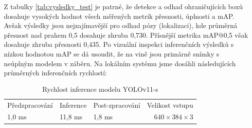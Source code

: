 Z tabulky \ref{tab:vysledky_test} je patrné, že detekce a odhad ohraničujících boxů dosahuje vysokých hodnot všech měřených metrik přesnosti, úplnosti a mAP. Avšak výsledky jsou nejzajímavější pro odhad pózy (lokalizaci), kde průměrná přesnost nad prahem 0,5 dosahuje zhruba 0,730. Přísnější metrika mAP@0,5 však dosahuje zhruba přesnosti 0,435. Po vizuální inspekci inferenčních výsledků s nízkou hodnotou mAP se dá usoudit, že na vině jsou primárně snímky s neúplným modelem v záběru. Na lokálním systému jsme dosáhli následujících průměrných inferenčních rychlostí:

\begin{table}[ht]
    \centering
    \begin{tabular}{@{}l l l r}    
    \toprule
    Předzpracování & Inference & Post-zpracování & Velikost vstupu \\
    1,0 ms & 11,8 ms & 1,8 ms & $640\times384\times3$ \\
    \end{tabular}
    \caption{Rychlost inference modelu YOLOv11-s}
    \label{tab:rychlost_yolo}
\end{table}